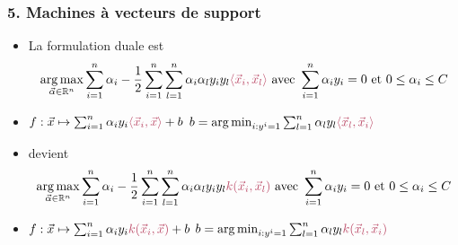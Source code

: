 \begin{frame}[t]
  \frametitle{5. Machines à vecteurs de support}
  \begin{itemize}
  \item[] La formulation duale est 
    { \footnotesize
      \[ \argmax_{\alphavec \in \RR^n} \sum_{i=1}^n \alpha_i - \frac12 \sum_{i=1}^n \sum_{l=1}^n
        \alpha_i \alpha_l y_i y_l \textcolor{MyPink}{\langle \xvec_i, \xvec_l \rangle}
        \text{ avec }
        \sum_{i=1}^n \alpha_i y_i = 0 \text{ et } 0 \leq \alpha_i \leq C     \]}
  \item[] { \footnotesize
      $f: \xvec \mapsto \sum_{i=1}^n \alpha_i y_i \textcolor{MyPink}{\langle \xvec_i, \xvec \rangle} + b$
      \hspace{2em}
      $b = \argmin_{i: y^i=1} \sum_{l=1}^n \alpha_l y_l \textcolor{MyPink}{\langle \xvec_l, \xvec_i \rangle}$  }
    \pause
  \item[] devient 
    { \footnotesize
      \[\argmax_{\alphavec \in \RR^n} \sum_{i=1}^n \alpha_i - \frac12 \sum_{i=1}^n \sum_{l=1}^n
        \alpha_i \alpha_l y_i y_l \textcolor{MyPink}{k(\xvec_i, \xvec_l)}
        \text{ avec }
        \sum_{i=1}^n \alpha_i y_i = 0 \text{ et } 0 \leq \alpha_i \leq C  \]}
  \item[] { \footnotesize
      $f: \xvec \mapsto \sum_{i=1}^n \alpha_i y_i \textcolor{MyPink}{k(\xvec_i, \xvec)} + b$ \hspace{2em}
      $b = \argmin_{i: y^i=1} \sum_{l=1}^n \alpha_l y_l \textcolor{MyPink}{k(\xvec_l, \xvec_i)}$  }
    \end{itemize}
  \end{frame}

